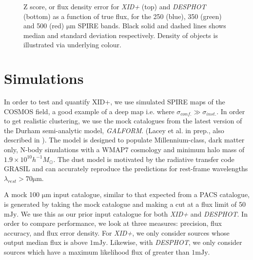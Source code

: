 \documentclass[useAMS,usenatbib]{mnras}
\begin{document}
\begin{figure}
\caption{Z score, or flux density error for \emph{XID+} (top) and \emph{DESPHOT} (bottom) as a function of true flux, for the 250 (blue), 350 (green) and 500 (red) $\mathrm{\mu m}$ SPIRE bands. Black solid and dashed lines shows median and standard deviation respectively. Density of objects is illustrated via underlying colour.}\label{fig:zscore}
\end{figure}

\section{Simulations}\label{sec:sims}
In order to test and quantify XID+, we use simulated SPIRE maps of the COSMOS field, a good example of a deep map i.e. where $\sigma_{conf.} \gg \sigma_{inst.}$. In order to get realistic clustering, we use the mock catalogues from the latest version of the Durham semi-analytic model, \emph{GALFORM}. (Lacey et al. in prep., also described in \cite{Cowley:2014}). The model is designed to populate Millennium-class, dark matter only, N-body simulations with a WMAP7 cosmology and minimum halo mass of $1.9 \times 10^{10} h^{-1} M_{\odot}$. The dust model is motivated by the radiative transfer code GRASIL \citep{Silva:1998} and can accurately reproduce the predictions for rest-frame wavelengths $\lambda_{rest} > 70 \mathrm{\mu m}$.

A mock 100 $\mathrm{\mu m}$ input catalogue, similar to that expected from a PACS catalogue, is generated by taking the mock catalogue and making a cut at a flux limit of 50 $\mathrm{mJy}$. We use this as our prior input catalogue for both \emph{XID+} and \emph{DESPHOT}. In order to compare performance, we look at three measures: precision, flux accuracy, and flux error density. For \emph{XID+}, we only consider sources whose output median flux is above $1\mathrm{mJy}$. Likewise, with \emph{DESPHOT}, we only consider sources which have a maximum likelihood flux of greater than $1\mathrm{mJy}$. 
\end{document}
